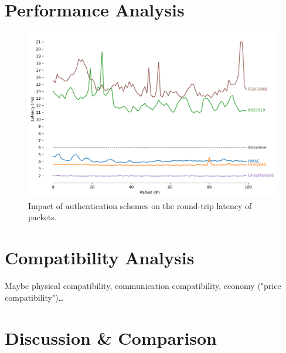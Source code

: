 \section{Performance Analysis}
\begin{figure}
    \centering
    \includegraphics[width=1.0\linewidth]{figures/rtt-estimation-results.pdf}
    \caption{Impact of authentication schemes on the round-trip latency of packets.}
    \label{fig:rtt_estimation_results}
\end{figure}

\section{Compatibility Analysis}
Maybe physical compatibility, communication compatibility, economy ("price compatibility")\dots

\section{Discussion \& Comparison}
